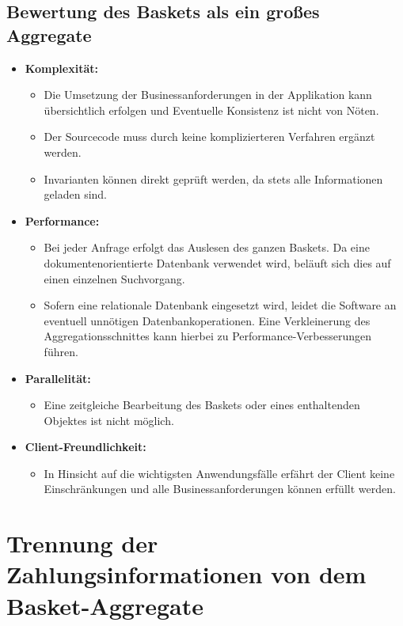 \subsection{Bewertung des Baskets als ein großes Aggregate}

\begin{itemize}[noitemsep,nolistsep,topsep=-2pt]
	\item \textbf{Komplexität: } {
		\begin{itemize}
			\item {Die Umsetzung der Businessanforderungen in der Applikation kann übersichtlich erfolgen und Eventuelle Konsistenz ist nicht von Nöten. }
			\item {Der Sourcecode muss durch keine komplizierteren Verfahren ergänzt werden.}
			\item {Invarianten können direkt geprüft werden, da stets alle Informationen geladen sind. }
		\end{itemize}
	}
	\item \textbf{Performance: } {
		\begin{itemize}
			\item Bei jeder Anfrage erfolgt das Auslesen des ganzen Baskets. Da eine dokumentenorientierte Datenbank verwendet wird, beläuft sich dies auf einen einzelnen Suchvorgang.
			\item Sofern eine relationale Datenbank eingesetzt wird, leidet die Software an eventuell unnötigen Datenbankoperationen. Eine Verkleinerung des Aggregationsschnittes kann hierbei zu Performance-Verbesserungen führen.
		\end{itemize}
	}
	\item \textbf{Parallelität: } {
		\begin{itemize}
			\item Eine zeitgleiche Bearbeitung des Baskets oder eines enthaltenden Objektes ist nicht möglich.
		\end{itemize}	
	}
	\item \textbf{Client-Freundlichkeit: } {
		\begin{itemize}
			\item In Hinsicht auf die wichtigsten Anwendungsfälle erfährt der Client keine Einschränkungen und alle Businessanforderungen können erfüllt werden.
		\end{itemize}
	}
\end{itemize}


\section{Trennung der Zahlungsinformationen von dem Basket-Aggregate}

